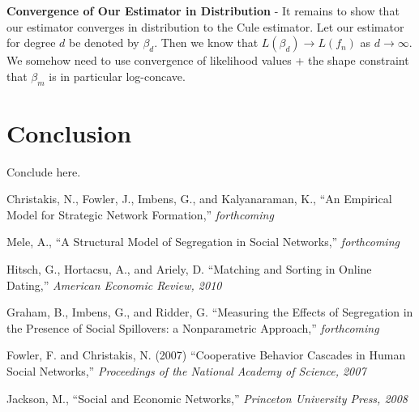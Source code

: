 \documentclass[11pt,reqno]{amsart}
\numberwithin{equation}{section}
\newcommand{\tb}{\textbf}
\newcommand{\be}{\beta}
\begin{document}
\tb{Convergence of Our Estimator in Distribution} - It remains to show that our estimator converges in distribution to the Cule estimator. Let our estimator for degree $d$ be denoted by $\be_d$. Then we know that $L(\be_d) \to L(f_n)$ as $d \to \infty$. We somehow need to use convergence of likelihood values + the shape constraint that $\beta_m$ is in particular log-concave. \\

\section{Conclusion} Conclude here. 








\begin{thebibliography}{9}

Christakis, N., Fowler, J., Imbens, G., and Kalyanaraman, K., 
``An Empirical Model for Strategic Network Formation,'' 
\emph{forthcoming} 

Mele, A., 
``A Structural Model of Segregation in Social Networks,'' 
\emph{forthcoming} 

Hitsch, G., Hortacsu, A., and Ariely, D. 
``Matching and Sorting in Online Dating,'' 
\emph{American Economic Review, 2010} 

Graham, B., Imbens, G., and Ridder, G. 
``Measuring the Effects of Segregation in the Presence of Social Spillovers: a Nonparametric Approach,'' 
\emph{forthcoming} 

Fowler, F. and Christakis, N. (2007) 
``Cooperative Behavior Cascades in Human Social Networks,'' 
\emph{Proceedings of the National Academy of Science, 2007} 

Jackson, M., 
``Social and Economic Networks,'' 
\emph{Princeton University Press, 2008} 



	
\end{thebibliography}
\end{document}
